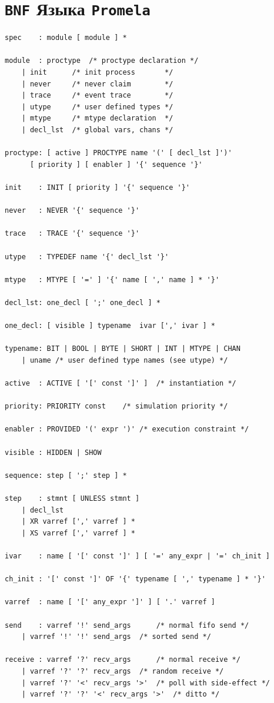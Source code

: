 \documentclass[12pt, twoside]{report}
\begin{document}
\section*{\texttt{BNF} Языка \texttt{Promela}}\label{promela_BNF}
\begin{verbatim}
spec	: module [ module ] *

module	: proctype	/* proctype declaration */
	| init		/* init process       */
	| never		/* never claim        */
	| trace		/* event trace        */
	| utype		/* user defined types */
	| mtype		/* mtype declaration  */
	| decl_lst	/* global vars, chans */

proctype: [ active ] PROCTYPE name '(' [ decl_lst ]')'
	  [ priority ] [ enabler ] '{' sequence '}'

init	: INIT [ priority ] '{' sequence '}'

never	: NEVER	'{' sequence '}'

trace	: TRACE '{' sequence '}'

utype	: TYPEDEF name '{' decl_lst '}'

mtype	: MTYPE [ '=' ] '{' name [ ',' name ] * '}'

decl_lst: one_decl [ ';' one_decl ] *

one_decl: [ visible ] typename  ivar [',' ivar ] *

typename: BIT | BOOL | BYTE | SHORT | INT | MTYPE | CHAN
	| uname	/* user defined type names (see utype) */

active  : ACTIVE [ '[' const ']' ]	/* instantiation */

priority: PRIORITY const	/* simulation priority */

enabler : PROVIDED '(' expr ')'	/* execution constraint */

visible	: HIDDEN | SHOW

sequence: step [ ';' step ] *

step    : stmnt	[ UNLESS stmnt ]
	| decl_lst
	| XR varref [',' varref ] *
	| XS varref [',' varref ] *

ivar    : name [ '[' const ']' ] [ '=' any_expr | '=' ch_init ]

ch_init : '[' const ']' OF '{' typename [ ',' typename ] * '}'

varref	: name [ '[' any_expr ']' ] [ '.' varref ]

send    : varref '!' send_args		/* normal fifo send */
	| varref '!' '!' send_args	/* sorted send */

receive : varref '?' recv_args		/* normal receive */
	| varref '?' '?' recv_args	/* random receive */
	| varref '?' '<' recv_args '>'	/* poll with side-effect */
	| varref '?' '?' '<' recv_args '>'	/* ditto */


\end{verbatim}
\end{document}

